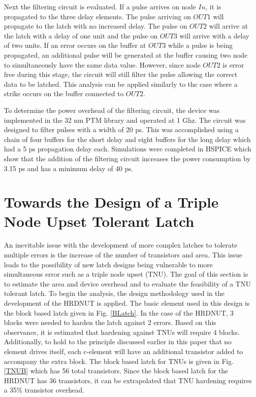 Next the filtering circuit is evaluated. If a pulse arrives on node $In$, it is propagated to the three delay elements. The pulse arriving on $OUT1$ will propagate to the latch with no increased delay. The pulse on $OUT2$ will arrive at the latch with a delay of one unit and the pulse on $OUT3$ will arrive with a delay of two units. If an error occurs on the buffer at $OUT3$ while a pulse is being propagated, an additional pulse will be generated at the buffer causing two node to simultaneously have the same data value. However, since node $OUT2$ is error free during this stage, the circuit will still filter the pulse allowing the correct data to be latched. This analysis can be applied similarly to the case where a strike occurs on the buffer connected to $OUT2$.

To determine the power overhead of the filtering circuit, the device was implemented in the 32 nm PTM library and operated at 1 Ghz. The circuit was designed to filter pulses with a width of 20 ps. This was accomplished using a chain of four buffers for the short delay and eight buffers for the long delay which had a 5 ps propagation delay each. Simulations were completed in HSPICE which show that the addition of the filtering circuit increases the power consumption by 3.15 ps and has a minimum delay of 40 ps.

\section{Towards the Design of a Triple Node Upset Tolerant Latch}
An inevitable issue with the development of more complex latches to tolerate multiple errors is the increase of the number of transistors and area. This issue leads to the possibility of new latch designs being vulnerable to more simultaneous error such as a triple node upset (TNU). The goal of this section is to estimate the area and device overhead and to evaluate the feasibility of a TNU tolerant latch. To begin the analysis, the design methodology used in the development of the HRDNUT is applied. The basic element used in this design is the block based latch given in Fig. \ref{BLatch}. In the case of the HRDNUT, 3 blocks were needed to harden the latch against 2 errors. Based on this observance, it is estimated that hardening against TNUs will require 4 blocks. Additionally, to hold to the principle discussed earlier in this paper that no element drives itself, each c-element will have an additional transistor added to accompany the extra block. The block based latch for TNUs is given in Fig. \ref{TNUB} which has 56 total transistors. Since the block based latch for the HRDNUT has 36 transistors, it can be extrapolated that TNU hardening requires a 35\% transistor overhead.

